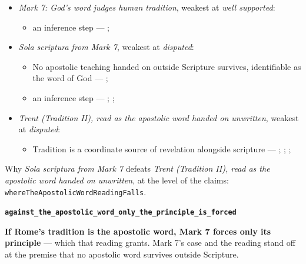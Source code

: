 \documentclass[11pt]{article}
\begin{document}
\begin{itemize}
\item \emph{Mark 7: God's word judges human tradition}, weakest at \emph{well supported}:
\begin{itemize}
\item an inference step --- \cite[Vatican II (1965), Dei Verbum 10]{tanner-decrees-1990}; \cite[IV.x.23]{calvin-institutes-1960}
\end{itemize}
\item \emph{Sola scriptura from Mark 7}, weakest at \emph{disputed}:
\begin{itemize}
\item No apostolic teaching handed on outside Scripture survives, identifiable as the word of God --- \cite[506]{whitaker-disputation-1849}; \cite[I.6]{westminster-confession-1647}
\item an inference step --- \cite{geiselmann-meaning-of-tradition-1966}; \cite[Vatican I (1870), Pastor Aeternus, ch. 4]{tanner-decrees-1990}; \cite{florovsky-bible-church-tradition-1972}
\end{itemize}
\item \emph{Trent (Tradition II), read as the apostolic word handed on unwritten}, weakest at \emph{disputed}:
\begin{itemize}
\item Tradition is a coordinate source of revelation alongside scripture --- \cite[Trent, Session IV (1546), Decree on Sacred Books and Traditions]{tanner-decrees-1990}; \cite{mathison-shape-sola-scriptura-2001}; \cite{geiselmann-meaning-of-tradition-1966}; \cite{congar-tradition-and-traditions-1966}
\end{itemize}
\end{itemize}
\noindent Why \emph{Sola scriptura from Mark 7} defeats \emph{Trent (Tradition II), read as the apostolic word handed on unwritten}, at the level of the claims: \texttt{where\allowbreak{}The\allowbreak{}Apostolic\allowbreak{}Word\allowbreak{}Reading\allowbreak{}Falls}.
\par\medskip\noindent\textbf{\texttt{against\_\allowbreak{}the\_\allowbreak{}apostolic\_\allowbreak{}word\_\allowbreak{}only\_\allowbreak{}the\_\allowbreak{}principle\_\allowbreak{}is\_\allowbreak{}forced}}\par\nobreak\noindent
\textbf{If Rome's tradition is the apostolic word, Mark 7 forces only its principle} — which that reading grants. Mark 7's case and the reading stand off at the premise that no apostolic word survives outside Scripture.
\end{document}

